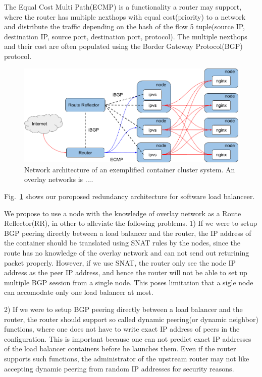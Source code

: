 The Equal Cost Multi Path(ECMP) is a functionality a router may support, where the router has multiple nexthops with equal cost(priority) to a network and distribute the traffic depending on the hash of the flow 5 tuple(source IP, destination IP, source port, destination port, protocol). 
The multiple nexthops and their cost are often populated using the Border Gateway Protocol(BGP) protocol.  

\begin{figure}[tb]
\begin{center}
\includegraphics[width=\columnwidth]{Figs/ecmp.png}
\end{center}
\caption{Network architecture of an exemplified container cluster system. An overlay networks is .... }
\label{fig:ecmp}
\end{figure}

Fig.~\ref{fig:ecmp} shows our poroposed redundancy architecture for software load balanceer.

We propose to use a node with the knowledge of overlay network as a Route Reflector(RR), in other to alleviate the following problems.
1) If we were to setup BGP peering directly between a load balancer and the router, the IP address of the container should be translated using SNAT rules by the nodes, since the route has no knowledge of the overlay network and can not send out returining packet properly.
However, if we use SNAT, the router only see the node IP address as the peer IP address, and hence the router will not be able to set up multiple BGP session from a single node.
This poses limitation that a sigle node can accomodate only one load balancer at most.

2) If we were to setup BGP peering directly between a load balancer and the router, the router should support so called dynamic peering(or dynamic neighbor) functions, where one does not have to write exact IP address of peers in the configuration.
This is important because one can not predict exact IP addresses of the load balancer containers before he launches them.
Even if the router supports such functions, the administrator of the upstream router may not like accepting dynamic peering from random IP addresses for security reasons.

